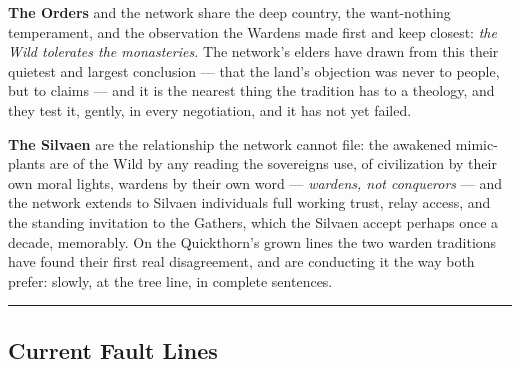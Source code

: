 \textbf{The Orders} and the network share the deep country, the want-nothing temperament, and the observation the Wardens made first and keep closest: \textit{the Wild tolerates the monasteries.} The network's elders have drawn from this their quietest and largest conclusion --- that the land's objection was never to people, but to claims --- and it is the nearest thing the tradition has to a theology, and they test it, gently, in every negotiation, and it has not yet failed.

\textbf{The Silvaen} are the relationship the network cannot file: the awakened mimic-plants are of the Wild by any reading the sovereigns use, of civilization by their own moral lights, wardens by their own word --- \textit{wardens, not conquerors} --- and the network extends to Silvaen individuals full working trust, relay access, and the standing invitation to the Gathers, which the Silvaen accept perhaps once a decade, memorably. On the Quickthorn's grown lines the two warden traditions have found their first real disagreement, and are conducting it the way both prefer: slowly, at the tree line, in complete sentences.

\medskip\hrule\medskip

\subsection{Current Fault Lines}

